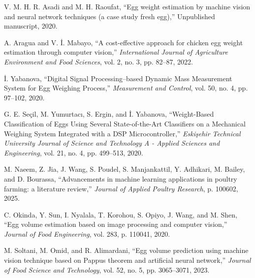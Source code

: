 \documentclass[conference]{IEEEtran}
\begin{document}
\begin{thebibliography}{00}
		 V. M. H. R. Asadi and M. H. Raoufat, “Egg weight estimation by machine vision and neural network techniques (a case study fresh egg),” Unpublished manuscript, 2020.
		
		 A. Aragua and V. İ. Mabayo, “A cost-effective approach for chicken egg weight estimation through computer vision,” \textit{International Journal of Agriculture Environment and Food Sciences}, vol. 2, no. 3, pp. 82–87, 2022.
		
		 İ. Yabanova, “Digital Signal Processing–based Dynamic Mass Measurement System for Egg Weighing Process,” \textit{Measurement and Control}, vol. 50, no. 4, pp. 97–102, 2020.
		
		 G. E. Seçil, M. Yumurtacı, S. Ergin, and İ. Yabanova, “Weight-Based Classification of Eggs Using Several State-of-the-Art Classifiers on a Mechanical Weighing System Integrated with a DSP Microcontroller,” \textit{Eskişehir Technical University Journal of Science and Technology A - Applied Sciences and Engineering}, vol. 21, no. 4, pp. 499–513, 2020.
		
		 M. Naeem, Z. Jia, J. Wang, S. Poudel, S. Manjankattil, Y. Adhikari, M. Bailey, and D. Bourassa, “Advancements in machine learning applications in poultry farming: a literature review,” \textit{Journal of Applied Poultry Research}, p. 100602, 2025.
		
		 C. Okinda, Y. Sun, I. Nyalala, T. Korohou, S. Opiyo, J. Wang, and M. Shen, “Egg volume estimation based on image processing and computer vision,” \textit{Journal of Food Engineering}, vol. 283, p. 110041, 2020.
		
		 M. Soltani, M. Omid, and R. Alimardani, “Egg volume prediction using machine vision technique based on Pappus theorem and artificial neural network,” \textit{Journal of Food Science and Technology}, vol. 52, no. 5, pp. 3065–3071, 2023.
		
	\end{thebibliography}
	
\end{document}
